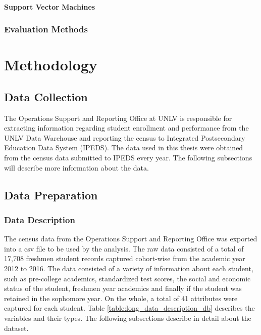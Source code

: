 \documentclass[11pt,openright]{report}
\begin{document}
\subsubsection {Support Vector Machines }

\subsection {Evaluation Methods}

\chapter{Methodology} \label{chapter:methodology}

\section{Data Collection}

The Operations Support and Reporting Office at UNLV is responsible for extracting information regarding student enrollment and performance from the UNLV Data Warehouse and reporting the census to Integrated Postsecondary Education Data System (IPEDS). The data used in this thesis were obtained from the census data submitted to IPEDS every year. The following subsections will describe more information about the data.

\section {Data Preparation}
\subsection{Data Description}
The census data from the Operations Support and Reporting Office was exported into a csv file to be used by the analysis. The raw data consisted of a total of 17,708 freshmen student records captured cohort-wise from the academic year 2012 to 2016. The data consisted of a variety of information about each student, such as pre-college academics, standardized test scores, the social and economic status of the student, freshmen year academics and finally if the student was retained in the sophomore year. On the whole, a total of 41 attributes were captured for each student. Table \ref{table:long_data_description_db} describes the variables and their types. The following subsections describe in detail about the dataset. 
\end{document}
